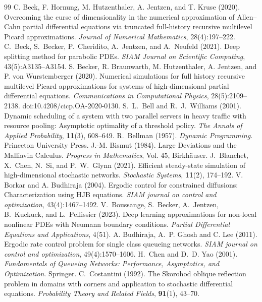 \documentclass[11pt]{article}
\theoremstyle{definition}
\theoremstyle{plain}
\begin{document}
\begin{singlespace}
\begin{thebibliography}{99}
   C. Beck, F. Hornung, M. Hutzenthaler, A. Jentzen, and T. Kruse (2020). \newblock Overcoming the curse of dimensionality in the numerical approximation of Allen--Cahn partial differential equations via truncated full-history recursive multilevel Picard approximations. \newblock \emph{Journal of Numerical Mathematics}, 28(4):197--222.
   C.~Beck, S.~Becker, P.~Cheridito, A.~Jentzen, and A.~Neufeld (2021). \newblock Deep splitting method for parabolic PDEs. \newblock \emph{SIAM Journal on Scientific Computing}, 43(5):A3135--A3154. %
   S. Becker, R. Braunwarth, M. Hutzenthaler, A. Jentzen, and P. von Wurstemberger (2020). \newblock Numerical simulations for full history recursive multilevel Picard approximations for systems of high-dimensional partial differential equations. \newblock \emph{Communications in Computational Physics}, 28(5):2109--2138. doi:10.4208/cicp.OA-2020-0130.
S.~L.~Bell and R.~J.~Williams (2001).
Dynamic scheduling of a system with two parallel servers in heavy traffic with resource pooling: Asymptotic optimality of a threshold policy.
\emph{The Annals of Applied Probability}, \textbf{11}(3), 608--649.
   R.~Bellman (1957). \newblock \emph{Dynamic Programming}. \newblock Princeton University Press.
   J.-M. Bismut (1984). \newblock Large Deviations and the Malliavin Calculus. \newblock \emph{Progress in Mathematics}, Vol. 45, Birkh\"auser.
J.~Blanchet, X.~Chen, N.~Si, and P.~W.~Glynn (2021).
Efficient steady-state simulation of high-dimensional stochastic networks.
\emph{Stochastic Systems}, \textbf{11}(2), 174--192.
   V. Borkar and A. Budhiraja (2004). \newblock Ergodic control for constrained diffusions: Characterization using HJB equations. 
  \newblock \emph{SIAM journal on control and optimization}, 43(4):1467--1492.
V.~Boussange, S.~Becker, A.~Jentzen, B.~Kuckuck, and L.~Pellissier (2023).
\newblock Deep learning approximations for non-local nonlinear PDEs with Neumann boundary conditions.
\newblock \emph{Partial Differential Equations and Applications}, 4(51).
   A. Budhiraja, A.~P. Ghosh and C. Lee (2011). \newblock Ergodic rate control problem for single class queueing networks. 
  \newblock \emph{SIAM journal on control and optimization}, 49(4):1570--1606.
   H.~Chen and D.~D. Yao (2001). \newblock \emph{Fundamentals of Queueing Networks: Performance, Asymptotics, and Optimization}. \newblock Springer.
C.~Costantini (1992).
The Skorohod oblique reflection problem in domains with corners and application to stochastic differential equations.
\emph{Probability Theory and Related Fields}, \textbf{91}(1), 43--70.


\end{thebibliography}
\end{singlespace}
\end{document}
